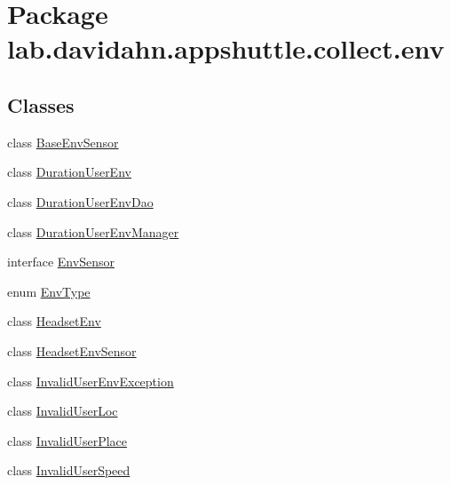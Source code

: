\hypertarget{namespacelab_1_1davidahn_1_1appshuttle_1_1collect_1_1env}{\section{\-Package lab.\-davidahn.\-appshuttle.\-collect.\-env}
\label{namespacelab_1_1davidahn_1_1appshuttle_1_1collect_1_1env}
}
\subsection*{\-Classes}
\begin{DoxyCompactItemize}
\item 
class \hyperlink{classlab_1_1davidahn_1_1appshuttle_1_1collect_1_1env_1_1_base_env_sensor}{\-Base\-Env\-Sensor}
\item 
class \hyperlink{classlab_1_1davidahn_1_1appshuttle_1_1collect_1_1env_1_1_duration_user_env}{\-Duration\-User\-Env}
\item 
class \hyperlink{classlab_1_1davidahn_1_1appshuttle_1_1collect_1_1env_1_1_duration_user_env_dao}{\-Duration\-User\-Env\-Dao}
\item 
class \hyperlink{classlab_1_1davidahn_1_1appshuttle_1_1collect_1_1env_1_1_duration_user_env_manager}{\-Duration\-User\-Env\-Manager}
\item 
interface \hyperlink{interfacelab_1_1davidahn_1_1appshuttle_1_1collect_1_1env_1_1_env_sensor}{\-Env\-Sensor}
\item 
enum \hyperlink{enumlab_1_1davidahn_1_1appshuttle_1_1collect_1_1env_1_1_env_type}{\-Env\-Type}
\item 
class \hyperlink{classlab_1_1davidahn_1_1appshuttle_1_1collect_1_1env_1_1_headset_env}{\-Headset\-Env}
\item 
class \hyperlink{classlab_1_1davidahn_1_1appshuttle_1_1collect_1_1env_1_1_headset_env_sensor}{\-Headset\-Env\-Sensor}
\item 
class \hyperlink{classlab_1_1davidahn_1_1appshuttle_1_1collect_1_1env_1_1_invalid_user_env_exception}{\-Invalid\-User\-Env\-Exception}
\item 
class \hyperlink{classlab_1_1davidahn_1_1appshuttle_1_1collect_1_1env_1_1_invalid_user_loc}{\-Invalid\-User\-Loc}
\item 
class \hyperlink{classlab_1_1davidahn_1_1appshuttle_1_1collect_1_1env_1_1_invalid_user_place}{\-Invalid\-User\-Place}
\item 
class \hyperlink{classlab_1_1davidahn_1_1appshuttle_1_1collect_1_1env_1_1_invalid_user_speed}{\-Invalid\-User\-Speed}

\end{DoxyCompactItemize}
